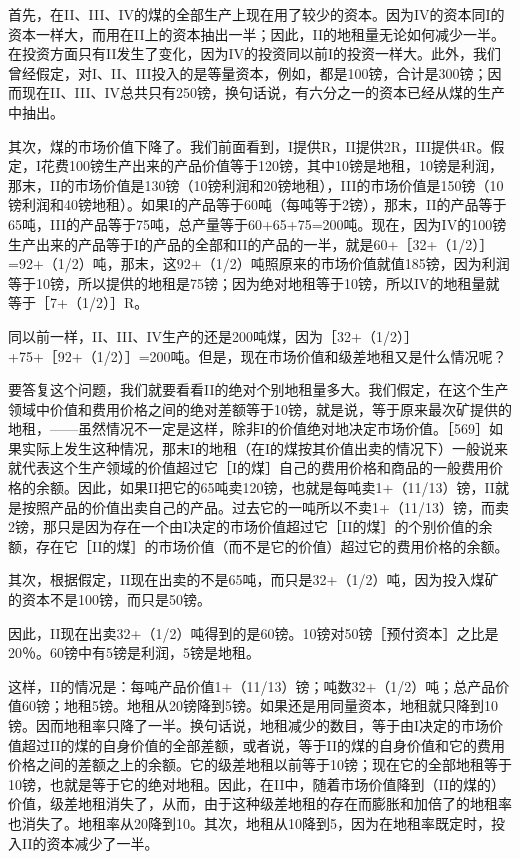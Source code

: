 首先，在II、III、IV的煤的全部生产上现在用了较少的资本。因为IV的资本同I的资本一样大，而用在II上的资本抽出一半；因此，II的地租量无论如何减少一半。在投资方面只有II发生了变化，因为IV的投资同以前I的投资一样大。此外，我们曾经假定，对I、II、III投入的是等量资本，例如，都是100镑，合计是300镑；因而现在II、III、IV总共只有250镑，换句话说，有六分之一的资本已经从煤的生产中抽出。

其次，煤的市场价值下降了。我们前面看到，I提供R，II提供2R，III提供4R。假定，I花费100镑生产出来的产品价值等于120镑，其中10镑是地租，10镑是利润，那末，II的市场价值是130镑（10镑利润和20镑地租），III的市场价值是150镑（10镑利润和40镑地租）。如果I的产品等于60吨（每吨等于2镑），那末，II的产品等于65吨，III的产品等于75吨，总产量等于60+65+75=200吨。现在，因为IV的100镑生产出来的产品等于I的产品的全部和II的产品的一半，就是60+［32+（1/2）］=92+（1/2）吨，那末，这92+（1/2）吨照原来的市场价值就值185镑，因为利润等于10镑，所以提供的地租是75镑；因为绝对地租等于10镑，所以IV的地租量就等于［7+（1/2）］R。

同以前一样，II、III、IV生产的还是200吨煤，因为［32+（1/2）］+75+［92+（1/2）］=200吨。但是，现在市场价值和级差地租又是什么情况呢？

要答复这个问题，我们就要看看II的绝对个别地租量多大。我们假定，在这个生产领域中价值和费用价格之间的绝对差额等于10镑，就是说，等于原来最次矿提供的地租，——虽然情况不一定是这样，除非I的价值绝对地决定市场价值。［569］如果实际上发生这种情况，那末I的地租（在I的煤按其价值出卖的情况下）一般说来就代表这个生产领域的价值超过它［I的煤］自己的费用价格和商品的一般费用价格的余额。因此，如果II把它的65吨卖120镑，也就是每吨卖1+（11/13）镑，II就是按照产品的价值出卖自己的产品。过去它的一吨所以不卖1+（11/13）镑，而卖2镑，那只是因为存在一个由I决定的市场价值超过它［II的煤］的个别价值的余额，存在它［II的煤］的市场价值（而不是它的价值）超过它的费用价格的余额。

其次，根据假定，II现在出卖的不是65吨，而只是32+（1/2）吨，因为投入煤矿的资本不是100镑，而只是50镑。

因此，II现在出卖32+（1/2）吨得到的是60镑。10镑对50镑［预付资本］之比是20％。60镑中有5镑是利润，5镑是地租。

这样，II的情况是：每吨产品价值1+（11/13）镑；吨数32+（1/2）吨；总产品价值60镑；地租5镑。地租从20镑降到5镑。如果还是用同量资本，地租就只降到10镑。因而地租率只降了一半。换句话说，地租减少的数目，等于由I决定的市场价值超过II的煤的自身价值的全部差额，或者说，等于II的煤的自身价值和它的费用价格之间的差额之上的余额。它的级差地租以前等于10镑；现在它的全部地租等于10镑，也就是等于它的绝对地租。因此，在II中，随着市场价值降到（II的煤的）价值，级差地租消失了，从而，由于这种级差地租的存在而膨胀和加倍了的地租率也消失了。地租率从20降到10。其次，地租从10降到5，因为在地租率既定时，投入II的资本减少了一半。

